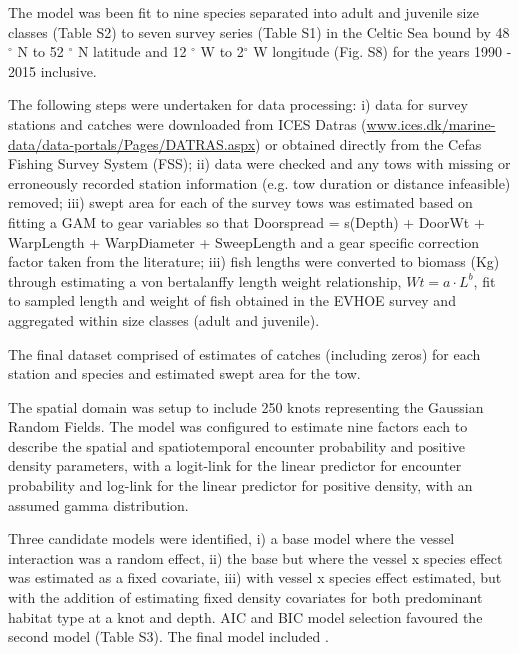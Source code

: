 \documentclass[12pt]{article}
\begin{document}
\begin{linenumbers}
The model was been fit to nine species separated into adult and juvenile size
classes (Table S2) to seven survey series (Table S1)
in the Celtic Sea bound by 48$^{\circ}$ N to 52 $^{\circ}$ N latitude and 12
$^{\circ}$ W to 2$^{\circ}$ W longitude (Fig. S8) for the years
1990 - 2015 inclusive. 

The following steps were undertaken for data processing: i) data for survey
stations and catches were downloaded from ICES Datras
(\url{www.ices.dk/marine-data/data-portals/Pages/DATRAS.aspx}) or obtained
directly from the Cefas Fishing Survey System (FSS); ii) data were checked and
any tows with missing or erroneously recorded station information (e.g. tow
duration or distance infeasible) removed; iii) swept area for each of the
survey tows was estimated based on fitting a GAM to gear variables so that
Doorspread = s(Depth) + DoorWt + WarpLength + WarpDiameter + SweepLength and a
gear specific correction factor taken from the literature\cite{Piet2009}; iii)
fish lengths were converted to biomass (Kg) through estimating a von
bertalanffy length weight relationship, $Wt = a \cdot L^{b}$, fit to sampled
length and weight of fish obtained in the EVHOE survey and aggregated within
size classes (adult and juvenile). 

The final dataset comprised of estimates of catches (including zeros) for each
station and species and estimated swept area for the tow.

The spatial domain was setup to include 250 knots representing the Gaussian
Random Fields. The model was configured to estimate nine factors each to describe
the spatial and spatiotemporal encounter probability and positive density
parameters, with a logit-link for the linear predictor for encounter
probability and log-link for the linear predictor for positive density, with an
assumed gamma distribution.

Three candidate models were identified, i) a base model where the vessel
interaction was a random effect, ii) the base but where the vessel x species
effect was estimated as a fixed covariate, iii) with vessel x species effect
estimated, but with the addition of estimating fixed density covariates for
both predominant habitat type at a knot and depth. AIC and BIC model selection
favoured the second model (Table S3). The final model included
.


\end{linenumbers}
\end{document}
